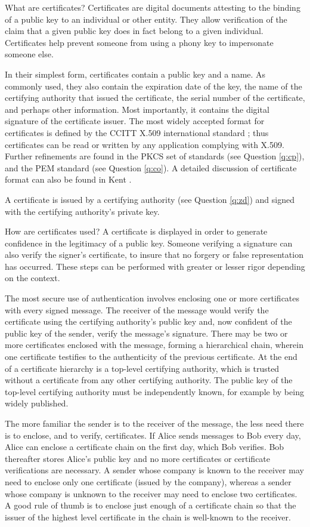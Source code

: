 {What are certificates?}
Certificates are digital documents attesting to the binding of a public key 
to an individual or other entity. They allow verification of the claim that 
a given public key does in fact belong to a given individual. Certificates 
help prevent someone from using a phony key to impersonate someone else.

In their simplest form, certificates contain a public key and a name. As
commonly used, they also contain the expiration date of the key, the name 
of the certifying authority that issued the certificate, the serial number 
of the certificate, and perhaps other information. Most importantly, it 
contains the digital signature of the certificate issuer. The most widely 
accepted format for certificates is defined by the CCITT X.509 international 
standard \cite{ccitt-X.509}; thus certificates can be read or written by any 
application complying with X.509. Further refinements are found in the PKCS 
set of standards (see Question \ref{q:cp}), and the PEM standard (see 
Question \ref{q:co}). A detailed discussion of certificate format can also 
be found in Kent \cite{kent-rfc1422}.

A certificate is issued by a certifying authority (see Question \ref{q:zd}) 
and signed with the certifying authority's private key.

{How are certificates used?}
A certificate is displayed in order to generate confidence in the 
legitimacy of a public key. Someone verifying a signature can also 
verify the signer's certificate, to insure that no forgery or false 
representation has occurred. These steps can be performed with greater or 
lesser rigor depending on the context. 

The most secure use of authentication involves enclosing one or more 
certificates with every signed message. The receiver of the message
would verify the certificate using the certifying authority's public
key and, now confident of the public key of the sender, verify the message's 
signature. There may be two or more certificates enclosed with the message, 
forming a hierarchical chain, wherein one certificate testifies to the 
authenticity of the previous certificate. At the end of a certificate 
hierarchy is a top-level certifying authority, which is trusted without a 
certificate from any other certifying authority. The public key of the 
top-level certifying authority must be independently known, for example by 
being widely published.

The more familiar the sender is to the receiver of the message, the less 
need there is to enclose, and to verify, certificates. If Alice sends 
messages to Bob every day, Alice can enclose a certificate chain on the 
first day, which Bob verifies. Bob thereafter stores Alice's public key 
and no more certificates or certificate verifications are necessary. A sender 
whose company is known to the receiver may need to enclose only one 
certificate (issued by the company), whereas a sender whose company is 
unknown to the receiver may need to enclose two certificates. A good rule of 
thumb is to enclose just enough of a certificate chain so that the issuer of 
the highest level certificate in the chain is well-known to the receiver.

